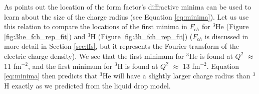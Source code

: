 
As \cite{Book:Povh} points out the location of the form factor's diffractive minima can be used to learn about the size of the charge radius (see Equation \ref{eq:minima}). Let us use this relation to compare the locations of the first minima in $F_{ch}$ for $^3$He (Figure \ref{fig:3he_fch_rep_fit}) and $^3$H (Figure \ref{fig:3h_fch_rep_fit}) ($F_{ch}$ is discussed in more detail in Section \ref{sec:ffs}, but it represents the Fourier transform of the electric charge density). We see that the first minimum for $^3$He is found at $Q^2$ $\approx$ 11 fm$^{-2}$, and the first minimum for $^3$H is found at $Q^2$ $\approx$ 13 fm$^{-2}$. Equation \ref{eq:minima} then predicts that $^3$He will have a slightly larger charge radius than $^3$H exactly as we predicted from the liquid drop model. 

 

